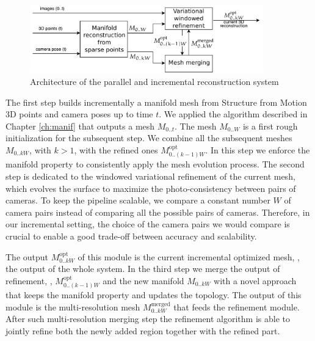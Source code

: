 \begin{figure}[t]
  \centering
  \includegraphics[width=0.9\textwidth]{./img/ch-incr-dens/incremental-mvs-architectureOK}
  \caption{Architecture of the parallel and incremental reconstruction system}
  \label{fig:architecture}
\end{figure}


The first step   builds incrementally a manifold mesh  from Structure from Motion 3D points and camera poses up to time $t$. We applied the algorithm described in Chapter \ref{ch:manif} that outputs a mesh $\mathit{M}_{0..t}$. The mesh  $\mathit{M}_{0..W}$ is a first rough initialization for the subsequent step. We combine all the subsequent meshes $\mathit{M}_{0..kW}$, with $k>1$, with the refined ones $\mathit{M}_{0..(k-1)W}^{\text{opt}}$. 
In this step we enforce the manifold property to consistently apply the mesh evolution process.
The second step is dedicated to the windowed variational refinement of the current mesh, which evolves the surface to maximize the photo-consistency between pairs of cameras.
To keep the pipeline scalable, we compare a constant number $W$ of camera pairs instead of comparing all the possible pairs of cameras. 
Therefore, in our incremental setting, the choice of the camera pairs we would compare is crucial to enable a good trade-off between  accuracy and scalability.

The output $\mathit{M}_{0..kW}^{\text{opt}}$ of this module is the current incremental optimized mesh, \ie, the output of the whole system.
In the third step we merge the output of refinement, \ie,   $\mathit{M}_{0..(k-1)W}^{\text{opt}}$  and the new manifold $\mathit{M}_{0..kW}$ with a novel approach that keeps the manifold property and updates the topology. 
The output of this module is the multi-resolution mesh $\mathit{M}_{0..kW}^{\text{merged}}$ that feeds the refinement module.
After such multi-resolution merging step the refinement algorithm is able to jointly refine both the newly added region together with the refined part.

